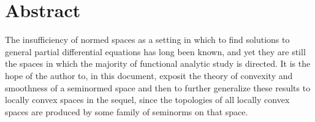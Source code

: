 \chapter*{Abstract}
\makeabstract


The insufficiency of normed spaces as a setting in which to find solutions to general partial differential equations has long been known, and yet they are still the spaces in which the majority of functional analytic study is  directed. It is the hope of the author to, in this document, exposit the theory of convexity and smoothness of a seminormed space and then to further generalize these results to locally convex spaces in the sequel, since the topologies of all locally convex spaces are produced by some family of seminorms on that space. 


\abstractsig
